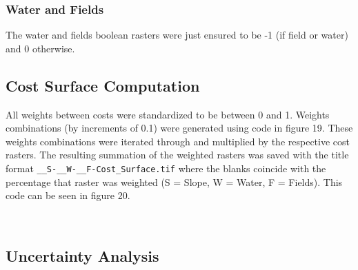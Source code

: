 \documentclass[article,12pt]{article}
\numberwithin{equation}{section}
\begin{document}
\subsubsection{Water and Fields}

The water and fields boolean rasters were just ensured to be -1 (if field or water) and 0 otherwise. 
\newpage
\subsection{Cost Surface Computation}

	All weights between costs were standardized to be between 0 and 1. Weights combinations (by increments of 0.1) were generated using code in figure 19. These weights combinations were iterated through and multiplied by the respective cost rasters. The resulting summation of the weighted rasters was saved with the title format \texttt{\_\_S-\_\_W-\_\_F-Cost\_Surface.tif} where the blanks coincide with the percentage that raster was weighted (S = Slope, W = Water, F = Fields). This code can be seen in figure 20.
	
\begin{adjustwidth}{-.8in}{-.8in}
\begin{multicols}{2}
	\\	


\end{multicols}
\end{adjustwidth}
\subsection{Uncertainty Analysis}
\end{document}
